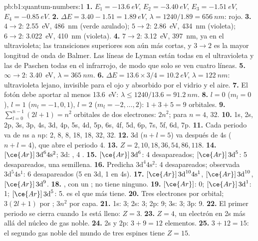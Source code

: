 \begin{solution}{pb:b1:quantum-numbers:1}
\textbf{1.} $E_1 = \qty{-13.6}{eV}$, $E_2 = \qty{-3.40}{eV}$,
$E_3 = \qty{-1.51}{eV}$, $E_4 = \qty{-0.85}{eV}$.
\textbf{2.} $\Delta E = 3.40 - 1.51 = \qty{1.89}{eV}$, $\lambda = 1240/1.89
= \qty{656}{nm}$: rojo.
\textbf{3.} $4 \to 2$: \qty{2.55}{eV}, \qty{486}{nm} (verde azulado);
$5 \to 2$: \qty{2.86}{eV}, \qty{434}{nm} (violeta); $6 \to 2$: \qty{3.022}{eV},
\qty{410}{nm} (violeta).
\textbf{4.} $7 \to 2$: \qty{3.12}{eV}, \qty{397}{nm}, ya en el
ultravioleta; las transiciones superiores son aún más cortas, y $3 \to 2$
es la mayor longitud de onda de Balmer. Las líneas de Lyman están todas en
el ultravioleta y las de Paschen todas en el infrarrojo, de modo que solo
se ven cuatro líneas.
\textbf{5.} $\infty \to 2$: \qty{3.40}{eV}, $\lambda = \qty{365}{nm}$.
\textbf{6.} $\Delta E = 13.6 \times 3/4 = \qty{10.2}{eV}$, $\lambda =
\qty{122}{nm}$: ultravioleta lejano, invisible para el ojo y absorbido por
el vidrio y el aire.
\textbf{7.} El fotón debe aportar al menos \qty{13.6}{eV}: $\lambda \le
1240/13.6 = \qty{91.2}{nm}$.
\textbf{8.} $l = 0$ ($m_l = 0$), $l = 1$ ($m_l = -1, 0, 1$), $l = 2$
($m_l = -2, \dots, 2$): $1 + 3 + 5 = 9$ orbitales.
\textbf{9.} $\sum_{l=0}^{n-1}(2l+1) = n^2$ orbitales de dos electrones:
$2n^2$; para $n = 4$, 32.
\textbf{10.} 1s, 2s, 2p, 3s, 3p, 4s, 3d, 4p, 5s, 4d, 5p, 6s, 4f, 5d, 6p,
7s, 5f, 6d, 7p.
\textbf{11.} Cada periodo va de $n$s a $n$p: 2, 8, 8, 18, 18, 32, 32.
\textbf{12.} 3d ($n + l = 5$) va después de 4s ($n + l = 4$), que abre el
periodo 4.
\textbf{13.} $Z = 2, 10, 18, 36, 54, 86, 118$.
\textbf{14.} $[\ce{Ar}]\,3\text{d}^6 4\text{s}^2$; 3d: ,
4 .
\textbf{15.}  $[\ce{Ar}]\,3\text{d}^6$: 4 desapareados;
 $[\ce{Ar}]\,3\text{d}^5$: 5 desapareados, una  semillena.
\textbf{16.} Predicha $3\text{d}^4 4\text{s}^2$: 4 desapareados; observada
$3\text{d}^5 4\text{s}^1$: 6 desapareados (5 en 3d, 1 en 4s).
\textbf{17.}  $[\ce{Ar}]\,3\text{d}^{10} 4\text{s}^1$, 
$[\ce{Ar}]\,3\text{d}^{10}$,  $[\ce{Ar}]\,3\text{d}^9$.
\textbf{18.} , con un ;  no tiene
ninguno.
\textbf{19.}  $[\ce{Ar}]$: 0;  $[\ce{Ar}]\,3\text{d}^1$:
1;  $[\ce{Ar}]\,3\text{d}^5$: 5.  es el que más
tiene.
\textbf{20.} Tres electrones por orbital; $3(2l + 1)$ por ;
$3n^2$ por capa.
\textbf{21.} 1s: 3; 2s: 3; 2p: 9; 3s: 3; 3p: 9.
\textbf{22.} El primer periodo se cierra cuando 1s está lleno: $Z = 3$.
\textbf{23.} $Z = 4$, un electrón en 2s más allá del núcleo de gas noble.
\textbf{24.} 2s y 2p: $3 + 9 = 12$ elementos.
\textbf{25.} $3 + 12 = 15$: el segundo gas noble del mundo de tres espines
tiene \textbf{$Z = 15$}.
\end{solution}
